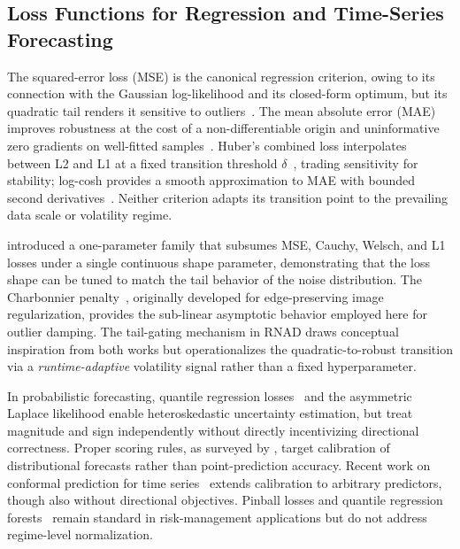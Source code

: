 \documentclass[11pt]{article}
\newcommand{\RNAD}{RNAD\xspace}
\begin{document}
\subsection{Loss Functions for Regression and Time-Series Forecasting}

The squared-error loss (MSE) is the canonical regression criterion,
owing to its connection with the Gaussian log-likelihood and its
closed-form optimum, but its quadratic tail renders it sensitive to
outliers~\citep{huber1964robust}. The mean absolute error (MAE)
improves robustness at the cost of a non-differentiable origin and
uninformative zero gradients on well-fitted
samples~\citep{hastie2009elements}. Huber's combined loss interpolates
between L2 and L1 at a fixed transition threshold
$\delta$~\citep{huber1964robust}, trading sensitivity for stability;
log-cosh provides a smooth approximation to MAE with bounded second
derivatives~\citep{saleh2024logcosh}. Neither criterion adapts its
transition point to the prevailing data scale or volatility regime.

\citet{barron2019general} introduced a one-parameter family that
subsumes MSE, Cauchy, Welsch, and L1 losses under a single continuous
shape parameter, demonstrating that the loss shape can be tuned to
match the tail behavior of the noise distribution.
The Charbonnier penalty~\citep{charbonnier1994deterministic},
originally developed for edge-preserving image regularization, provides
the sub-linear asymptotic behavior employed here for outlier damping.
The tail-gating mechanism in \RNAD draws conceptual inspiration from
both works but operationalizes the quadratic-to-robust transition
via a \emph{runtime-adaptive} volatility signal rather than a fixed
hyperparameter.

In probabilistic forecasting, quantile regression
losses~\citep{koenker1978regression} and the asymmetric Laplace
likelihood enable heteroskedastic uncertainty estimation, but treat
magnitude and sign independently without directly incentivizing
directional correctness. Proper scoring rules, as surveyed by
\citet{gneiting2007strictly}, target calibration of distributional
forecasts rather than point-prediction accuracy. Recent work on
conformal prediction for time series~\citep{stankeviciute2021conformal}
extends calibration to arbitrary predictors, though also without
directional objectives. Pinball losses and quantile regression
forests~\citep{meinshausen2006quantile} remain standard in
risk-management applications but do not address regime-level
normalization.
\end{document}
